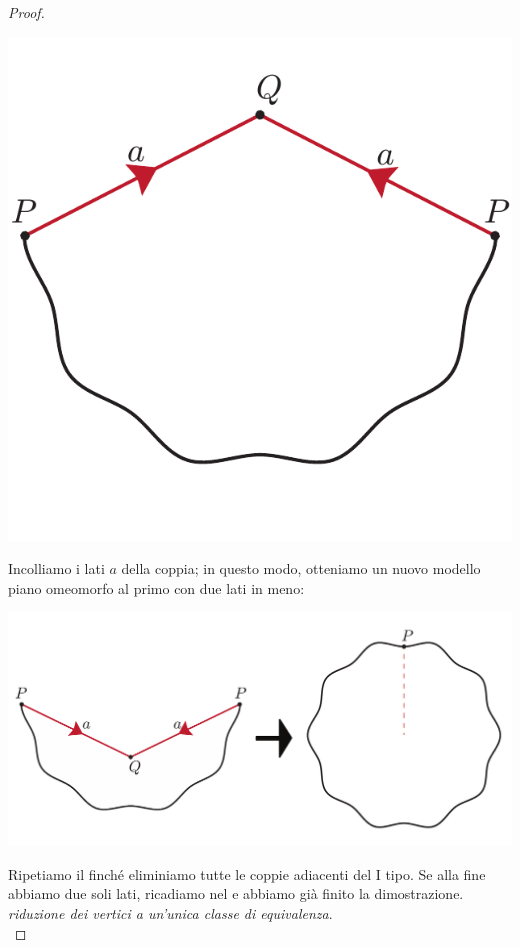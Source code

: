 \begin{proof}{}
\begin{center}
	\includegraphics[trim=0cm 0cm 0cm 0cm, clip, scale=0.35]{images/cutandpastealgorithmstep1-1.pdf}
\end{center}
Incolliamo i lati $a$ della coppia; in questo modo, otteniamo un nuovo modello piano omeomorfo al primo con due lati in meno:
\begin{center}
	\includegraphics[trim=0cm 0cm 0cm 0cm, clip, scale=0.35]{images/cutandpastealgorithmstep1-2.pdf}
\end{center}
Ripetiamo il  finché eliminiamo tutte le coppie adiacenti del I tipo. Se alla fine abbiamo due soli lati, ricadiamo nel  e abbiamo già finito la dimostrazione.\\
 \textit{riduzione dei vertici a un'unica classe di equivalenza}.\\

\end{proof}
